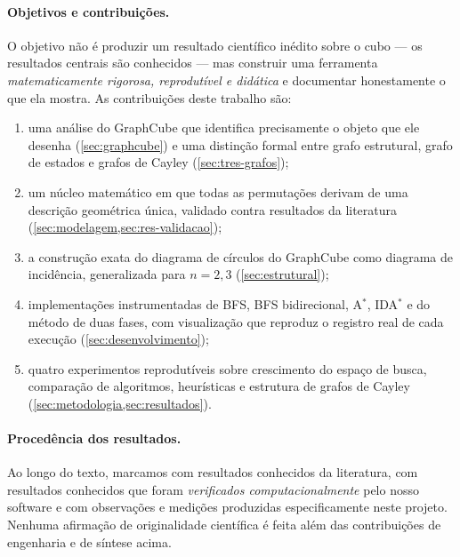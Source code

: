 \paragraph{Objetivos e contribuições.} O objetivo não é produzir um resultado científico inédito sobre o cubo --- os resultados centrais são conhecidos --- mas construir uma ferramenta \emph{matematicamente rigorosa, reprodutível e didática} e documentar honestamente o que ela mostra. As contribuições deste trabalho são:
\begin{enumerate}[nosep,label=(\roman*)]
  \item uma análise do GraphCube que identifica precisamente o objeto que ele desenha (\cref{sec:graphcube}) e uma distinção formal entre grafo estrutural, grafo de estados e grafos de Cayley (\cref{sec:tres-grafos});
  \item um núcleo matemático em que todas as permutações derivam de uma descrição geométrica única, validado contra resultados da literatura (\cref{sec:modelagem,sec:res-validacao});
  \item a construção exata do diagrama de círculos do GraphCube como diagrama de incidência, generalizada para $n=2,3$ (\cref{sec:estrutural});
  \item implementações instrumentadas de BFS, BFS bidirecional, A$^*$, IDA$^*$ e do método de duas fases, com visualização que reproduz o registro real de cada execução (\cref{sec:desenvolvimento});
  \item quatro experimentos reprodutíveis sobre crescimento do espaço de busca, comparação de algoritmos, heurísticas e estrutura de grafos de Cayley (\cref{sec:metodologia,sec:resultados}).
\end{enumerate}

\paragraph{Procedência dos resultados.} Ao longo do texto, marcamos com \lit{} resultados conhecidos da literatura, com \ver{} resultados conhecidos que foram \emph{verificados computacionalmente} pelo nosso software e com \proj{} observações e medições produzidas especificamente neste projeto. Nenhuma afirmação de originalidade científica é feita além das contribuições de engenharia e de síntese acima.

